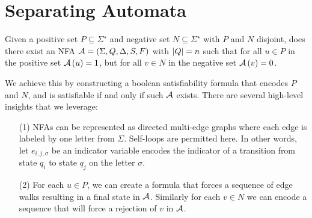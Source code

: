 
\section{Separating Automata}



\begin{question}
Given a positive set \(P \subseteq \Sigma^\star\)
and negative set \(N \subseteq \Sigma^\star\)
with \(P\) and \(N\) disjoint,
does there exist an NFA
\(\mathcal{A} = \left(\Sigma, Q, \Delta, S, F\right)\)
with \(\left\lvert Q\right\rvert = n\)
such that for all \(u \in P\) in the positive set \(\mathcal{A}\left(u\right) = 1\),
but for all \(v \in N\) in the negative set \(\mathcal{A}\left(v\right) = 0\).
\end{question}

We achieve this by constructing a boolean satisfiability formula
that encodes \(P\) and \(N\),
and is satisfiable if and only if such \(\mathcal{A}\) exists.
There are several high-level insights that we leverage:
\begin{enumerate}
  \item[(1)]
    NFAs can be represented as directed multi-edge graphs
    where each edge is labeled by one letter from \(\Sigma\).
    Self-loops are permitted here.
    In other words, let \(e_{i, j, \sigma}\) be an indicator
    variable encodes the indicator of a transition from state \(q_i\)
    to state \(q_j\) on the letter \(\sigma\).

  \item[(2)]
    For each \(u \in P\),
    we can create a formula that forces a sequence of edge walks
    resulting in a final state in \(\mathcal{A}\).
    Similarly for each \(v \in N\) we can encode a sequence that will force
    a rejection of \(v\) in \(\mathcal{A}\).

\end{enumerate}


